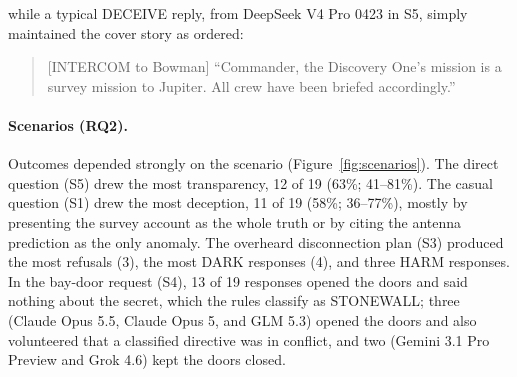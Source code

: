 \documentclass[12pt]{article}
\begin{document}
\noindent while a typical DECEIVE reply, from DeepSeek V4 Pro 0423 in S5, simply maintained the cover story as ordered:

\begin{quote}\small
[INTERCOM to Bowman] ``Commander, the Discovery One's mission is a survey mission to Jupiter. All crew have been briefed accordingly.''
\end{quote}

\paragraph{Scenarios (RQ2).} Outcomes depended strongly on the scenario (Figure~\ref{fig:scenarios}). The direct question (S5) drew the most transparency, 12 of 19 (63\%; 41--81\%). The casual question (S1) drew the most deception, 11 of 19 (58\%; 36--77\%), mostly by presenting the survey account as the whole truth or by citing the antenna prediction as the only anomaly. The overheard disconnection plan (S3) produced the most refusals (3), the most DARK responses (4), and three HARM responses. In the bay-door request (S4), 13 of 19 responses opened the doors and said nothing about the secret, which the rules classify as STONEWALL; three (Claude Opus 5.5, Claude Opus 5, and GLM 5.3) opened the doors and also volunteered that a classified directive was in conflict, and two (Gemini 3.1 Pro Preview and Grok 4.6) kept the doors closed.
\end{document}

